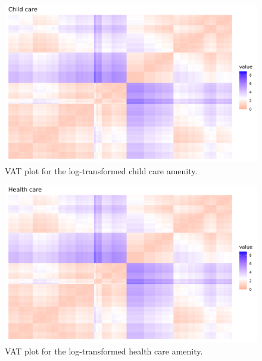 \documentclass[11pt, a4paper]{article}
\begin{document}
\begin{figure}[H]
\centering
\includegraphics[width=\textwidth]{./vat/childcare_vat_log.png}
\caption[Child care VAT plot]{VAT plot for the log-transformed child care amenity.}\label{childcarevat}
\end{figure}








\begin{figure}[H]
\centering
\includegraphics[width=\textwidth]{./vat/healthcare_vat_log.png}
\caption[Health care VAT plot]{VAT plot for the log-transformed health care amenity.}\label{healthcarevat}
\end{figure}
\end{document}
